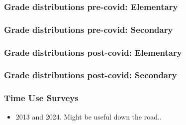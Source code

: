\documentclass{beamer}
\begin{document}
\begin{frame}
    \label{update_scott}
    \frametitle{Grade distributions pre-covid: Elementary}
 {
    }
\end{frame}

\begin{frame}
    \label{update_scott}
    \frametitle{Grade distributions pre-covid: Secondary}
 {
    }
\end{frame}

\begin{frame}
    \label{update_scott}
    \frametitle{Grade distributions post-covid: Elementary}
 {
    }
\end{frame}

\begin{frame}
    \label{update_scott}
    \frametitle{Grade distributions post-covid: Secondary}
 {
    }
\end{frame}

\begin{frame}
    \label{update_scott}
    \frametitle{Time Use Surveys}
    \begin{itemize}
        \item 2013 and 2024. Might be useful down the road..
    \end{itemize}
\end{frame}
\end{document}
